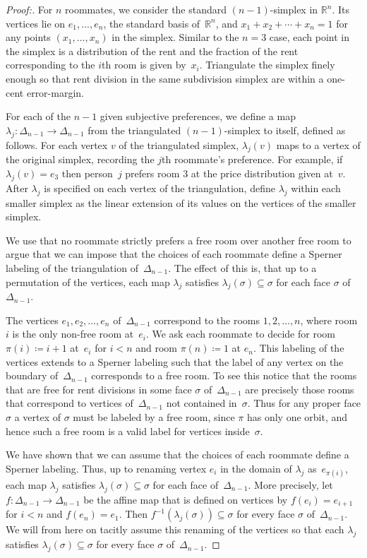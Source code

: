 \documentclass[a4paper,10pt,reqno, english]{amsart}
\theoremstyle{plain}
\theoremstyle{definition}
\newcommand{\R}{\mathbb{R}}
\begin{document}
\begin{proof}[Proof:]
	For $n$ roommates, we consider the standard $(n-1)$-simplex in $\R^n$. Its vertices lie on $e_1,...,e_n$, the standard basis of~$\R^n$, and $x_1+x_2+\cdots+x_n = 1$ for any points $(x_1,\dots,x_n)$ in the simplex. Similar to the $n=3$ case, each point in the simplex is a distribution of the rent and the fraction of the rent corresponding to the $i$th room is given by~$x_i$. Triangulate the simplex finely enough so that rent division in the same subdivision simplex are within a one-cent error-margin.
		
	For each of the $n-1$ given subjective preferences, we define a map $\lambda_j\colon \Delta_{n-1} \longrightarrow \Delta_{n-1}$ from the triangulated $(n-1)$-simplex to itself, defined as follows. For each vertex $v$ of the triangulated simplex, $\lambda_j(v)$ maps to a vertex of the original simplex, recording the $j$th roommate's preference. For example, if $\lambda_j(v) = e_3$ then person~$j$ prefers room 3 at the price distribution given at~$v$. After $\lambda_j$ is specified on each vertex of the triangulation, define $\lambda_j$ within each smaller simplex as the linear extension of its values on the vertices of the smaller simplex.
	
	We use that no roommate strictly prefers a free room over another free room to argue 
that we can impose that the choices of each roommate define a Sperner labeling of the triangulation of~$\Delta_{n-1}$.
The effect of this is, that up to a permutation of the vertices, each map $\lambda_j$ satisfies $\lambda_j(\sigma) \subseteq \sigma$ for each
face $\sigma$ of~$\Delta_{n-1}$. 

The vertices $e_1, e_2, \dots, e_n$ of~$\Delta_{n-1}$ correspond to the rooms $1,2,\dots, n$, where room $i$ is the only
non-free room at~$e_i$. We ask each roommate to decide for room $\pi(i) \coloneqq i+1$ at~$e_i$ for $i < n$ and room $\pi(n) \coloneqq 1$ at $e_n$.
This labeling of the vertices extends to a Sperner labeling such that the label of any vertex on the boundary
of~$\Delta_{n-1}$ corresponds to a free room. To see this notice that the rooms that are free for rent divisions in some face
$\sigma$ of~$\Delta_{n-1}$ are precisely those rooms that correspond to vertices of~$\Delta_{n-1}$ not contained in~$\sigma$.
Thus for any proper face $\sigma$ a vertex of $\sigma$ must be labeled by a free room, since $\pi$ has only one orbit, 
and hence such a free room is a valid label for vertices inside~$\sigma$.

We have shown that we can assume that the choices of each roommate define a Sperner labeling.
Thus, up to renaming vertex $e_i$ in the domain of $\lambda_j$ as~$e_{\pi(i)}$, 
each map $\lambda_j$ satisfies $\lambda_j(\sigma) \subseteq \sigma$ for each face of~$\Delta_{n-1}$. 
More precisely, let $f \colon \Delta_{n-1} \longrightarrow \Delta_{n-1}$ be the affine map that is 
defined on vertices by $f(e_i) = e_{i+1}$ for $i < n$ and $f(e_n) = e_1$. Then $f^{-1}(\lambda_j(\sigma)) \subseteq \sigma$ for every face $\sigma$ of~$\Delta_{n-1}$.
We will from here on tacitly assume this renaming of the vertices so that each $\lambda_j$ satisfies $\lambda_j(\sigma) \subseteq \sigma$
for every face $\sigma$ of~$\Delta_{n-1}$.


\end{proof}
\end{document}
